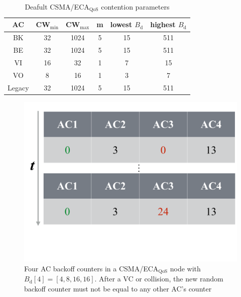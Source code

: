 	\begin{table}[tb]
		\centering
		\caption{Deafult CSMA/ECA$_{\text{QoS}}$ contention parameters}
		\label{tab:ecaQosParams}
		\begin{tabular}{|c|c|c|c|c|c|}
			\hline
			{\bfseries AC} & {\bfseries CW$_{\min}$} & {\bfseries CW$_{\max}$} & {\bfseries m} & {\bfseries lowest $B_{\text{d}}$} & {\bfseries highest $B_{\text{d}}$}\\
			\hline
			BK		       &	32				&		1024		  & 		5	&			15		        &		511\\
			BE		       &	32				&		1024		  &		5	&			15		        &		511\\
			VI		       &	16				&		32			  & 		1	&			7		        &		15\\
			VO		       &	8				&		16		 	 & 		1	&			3		        &		7\\
			Legacy	       &	32				&		1024		  & 		5	&			15		        &		511\\
			\hline
		\end{tabular}
	\end{table}

	\begin{figure}[tb]
	\centering
		\includegraphics[width=0.8\linewidth]{figures/smartBackoff1.pdf}
		\caption{Four AC backoff counters in a CSMA/ECA$_{\text{QoS}}$ node with $B_{\text{d}}[4]=[4,8,16,16]$. After a VC or collision, the new random backoff counter must not be equal to any other AC's counter}
		\label{fig:smartBackoff1}
	\end{figure}
